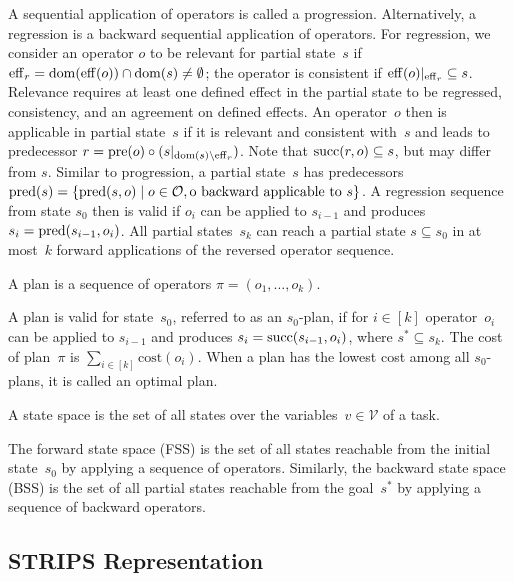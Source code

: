 A sequential application of operators is called a progression. Alternatively, a regression is a backward sequential application of operators. For regression, we consider an operator $o$ to be relevant for partial state~$s$ if $\operatorname{eff}_r=\operatorname{dom}(\operatorname{eff}(o))\cap\operatorname{dom}(s)\neq\emptyset$; the operator is consistent if $\operatorname{eff}(o)|_{\operatorname{eff}_r} \subseteq s$. Relevance requires at least one defined effect in the partial state to be regressed, consistency, and an agreement on defined effects. An operator~$o$ then is  applicable in partial state~$s$ if it is relevant and consistent with~$s$ and leads to predecessor $r=\operatorname{pre}(o)\circ (s|_{\operatorname{dom}(s)\setminus\operatorname{eff}_r})$. Note that $\operatorname{succ}(r,o)\subseteq s$, but may differ from $s$. Similar to progression, a partial state~$s$ has predecessors $\operatorname{pred}(s)=\{\operatorname{pred}(s,o)\mid o\in \mathcal{O}, \text{o backward applicable to }s\}$. A regression sequence from state $s_0$ then is valid if $o_i$ can be applied to $s_{i-1}$ and produces $s_i=\operatorname{pred}(s_{i-1},o_i)$. All partial states~$s_k$ can reach a partial state $s\subseteq s_0$ in at most~$k$ forward applications of the reversed operator sequence.

\begin{definition}[Plan]\label{def:plan}
    A plan is a sequence of operators $\pi=(o_1,\ldots,o_k)$.
\end{definition}

A plan is valid for state~$s_0$, referred to as an $s_0$-plan, if for $i\in[k]$ operator~$o_i$ can be applied to $s_{i-1}$ and produces $s_i=\operatorname{succ}(s_{i-1},o_i)$, where $s^* \subseteq s_k$. The cost of plan~$\pi$ is $\sum_{i\in[k]} \text{cost}(o_i)$. When a plan has the lowest cost among all $s_0$-plans, it is called an optimal plan.

\begin{definition}\label{def:statespace}
    A state space is the set of all states over the variables~$v \in \mathcal{V}$ of a task.
\end{definition}

The forward state space (FSS) is the set of all states reachable from the initial state~$s_0$ by applying a sequence of operators. Similarly, the backward state space (BSS) is the set of all partial states reachable from the goal~$s^*$ by applying a sequence of backward operators.

\subsection{STRIPS Representation}
\label{sec:background_strips}

